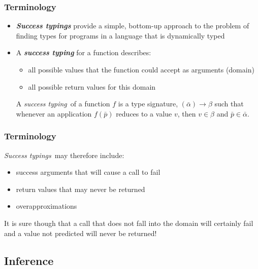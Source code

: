 \documentclass{beamer}
\newcommand{\st}{\emph{success typing}}
\newcommand{\Sts}{\emph{Success typings}}
\begin{document}
\begin{frame}
  \frametitle{Terminology}
  \begin{itemize}
  \item \textbf{\Sts}\cite{success_typings} provide a
    simple, bottom-up approach to the problem of finding types for
    programs in a language that is dynamically typed \pause
  \item A \textbf{\st} for a function describes:
    \begin{itemize}
    \item all possible values that the function could accept as
      arguments (domain)
    \item all possible return values for this domain
    \end{itemize} \pause
    \begin{definition}
      A \st\ of a function $f$ is a type signature,
      $(\bar{\alpha}) \rightarrow \beta$ such that whenever an
      application $f(\bar{p})$ reduces to a value $v$, then $v \in
      \beta$ and $\bar{p} \in \bar{\alpha}$.
    \end{definition}
  \end{itemize}
\end{frame}

\begin{frame}
  \frametitle{Terminology}
  \Sts\ may therefore include:
  \begin{itemize}
  \item success arguments that will cause a call to fail
  \item return values that may never be returned
  \item overapproximations
  \end{itemize} \pause
  It is sure though that a call that does not fall into the domain
  will certainly fail and a value not predicted will never be
  returned!
\end{frame}

\subsection{Inference}
\end{document}
